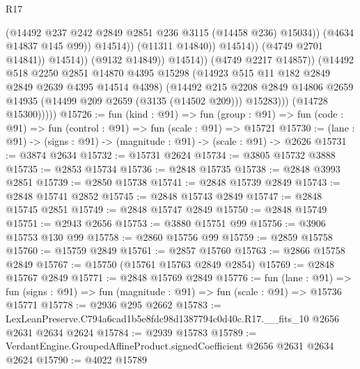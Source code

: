 \begin{lexlean}{R17}
\begin{coremodule}
                                          (@14492
                                            @237
                                            @242
                                            @2849
                                            @2851
                                            @236
                                            @3115
                                            (@14458 @236)
                                            @15034))
                                        (@4634 @14837 @145 @99))
                                      @14514))
                                  (@11311 @14840))
                                @14514))
                            (@4749 @2701 @14841))
                          @14514))
                      (@9132 @14849))
                    @14514))
                (@4749 @2217 @14857))
              (@14492
                @518
                @2250
                @2851
                @14870
                @4395
                @15298
                (@14923 @515 @11 @182 @2849 @2849 @2639 @4395 @14514 @4398)
                (@14492
                  @215
                  @2208
                  @2849
                  @14806
                  @2659
                  @14935
                  (@14499 @209 @2659 (@3135 (@14502 @209)))
                  @15283)))
            (@14728 @15300)))))
@15726 := fun (kind : @91) =>
  fun (group : @91) => fun (code : @91) => fun (control : @91) => fun (scale : @91) => @15721
@15730 := (lane : @91) -> (signs : @91) -> (magnitude : @91) -> (scale : @91) -> @2626
@15731 := @3874 @2634
@15732 := @15731 @2624
@15734 := @3805 @15732 @3888
@15735 := @2853 @15734
@15736 := @2848 @15735
@15738 := @2848 @3993 @2851
@15739 := @2850 @15738
@15741 := @2848 @15739 @2849
@15743 := @2848 @15741 @2852
@15745 := @2848 @15743 @2849
@15747 := @2848 @15745 @2851
@15749 := @2848 @15747 @2849
@15750 := @2848 @15749
@15751 := @2943 @2656
@15753 := @3880 @15751 @99
@15756 := @3906 @15753 @130 @99
@15758 := @2860 @15756 @99
@15759 := @2859 @15758
@15760 := @15759 @2849
@15761 := @2857 @15760
@15763 := @2866 @15758 @2849
@15767 := @15750 (@15761 @15763 @2849 @2854)
@15769 := @2848 @15767 @2849
@15771 := @2848 @15769 @2849
@15776 := fun (lane : @91) =>
  fun (signs : @91) => fun (magnitude : @91) => fun (scale : @91) => @15736 @15771
@15778 := @2936 @295 @2662
@15783 := LexLeanPreserve.C794a6cad1b5e8fdc98d1387794c0d40c.R17.__fits_10 @2656 @2631 @2634 @2624
@15784 := @2939 @15783
@15789 := VerdantEngine.GroupedAffineProduct.signedCoefficient @2656 @2631 @2634 @2624
@15790 := @4022 @15789

\end{coremodule}
\end{lexlean}
